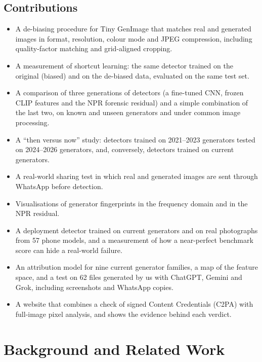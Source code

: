 \documentclass{mnnit}
\begin{document}
\section{Contributions}
\begin{itemize}
  \item A de-biasing procedure for Tiny GenImage that matches real and
        generated images in format, resolution, colour mode and JPEG
        compression, including quality-factor matching and
        grid-aligned cropping.
  \item A measurement of shortcut learning: the same detector trained on
        the original (biased) and on the de-biased data, evaluated on the
        same test set.
  \item A comparison of three generations of detectors (a fine-tuned
        CNN, frozen CLIP features and the NPR forensic residual) and a
        simple combination of the last two, on known and unseen
        generators and under common image processing.
  \item A ``then versus now'' study: detectors trained on 2021--2023
        generators tested on 2024--2026 generators, and, conversely,
        detectors trained on current generators.
  \item A real-world sharing test in which real and generated images are
        sent through WhatsApp before detection.
  \item Visualisations of generator fingerprints in the frequency domain
        and in the NPR residual.
  \item A deployment detector trained on current generators and on
        real photographs from 57 phone models, and a measurement of how a
        near-perfect benchmark score can hide a real-world failure.
  \item An attribution model for nine current generator families, a map
        of the feature space, and a test on 62 files generated by us with
        ChatGPT, Gemini and Grok, including screenshots and WhatsApp
        copies.
  \item A website that combines a check of signed Content Credentials
        (C2PA) with full-image pixel analysis, and shows the evidence
        behind each verdict.
\end{itemize}

\chapter{Background and Related Work}
\end{document}

